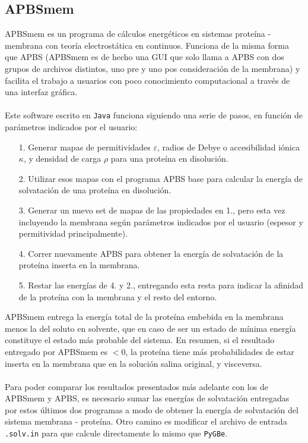 \documentclass[12pt, twoside, onehalfspace, numbers, spanish]{ezthesis}
\numberwithin{equation}{section}
\begin{document}
\subsection{APBSmem}\label{subsec:APBSmem}
APBSmem es un programa de cálculos energéticos en sistemas proteína - membrana con teoría electrostática en continuos. Funciona de la misma forma que APBS (APBSmem es de hecho una GUI que solo llama a APBS con dos grupos de archivos distintos, uno pre y uno pos consideración de la membrana) y facilita el trabajo a usuarios con poco conocimiento computacional a través de una interfaz gráfica.\\\\
Este software escrito en \texttt{Java} funciona siguiendo una serie de pasos, en función de parámetros indicados por el usuario:
\begin{itemize}
	\item[1.] Generar mapas de permitividades $\varepsilon$, radios de Debye o accesibilidad iónica $\kappa$, y densidad de carga $\rho$ para una proteína en disolución.
	\item[2.] Utilizar esos mapas con el programa APBS base para calcular la energía de solvatación de una proteína en disolución.
	\item[3.] Generar un nuevo set de mapas de las propiedades en 1., pero esta vez incluyendo la membrana según parámetros indicados por el usuario (espesor y permitividad principalmente).
	\item[4.] Correr nuevamente APBS para obtener la energía de solvatación de la proteína inserta en la membrana.
	\item[5.] Restar las energías de 4. y 2., entregando esta resta para indicar la afinidad de la proteína con la membrana y el resto del entorno.
\end{itemize}
APBSmem entrega la energía total de la proteína embebida en la membrana menos la del soluto en solvente, que en caso de ser un estado de mínima energía constituye el estado más probable del sistema. En resumen, si el resultado entregado por APBSmem es $<0$, la proteína tiene más probabilidades de estar inserta en la membrana que en la solución salina original, y visceversa.\\\\
Para poder comparar los resultados presentados más adelante con los de APBSmem y APBS, es necesario sumar las energías de solvatación entregadas por estos últimos dos programas a modo de obtener la energía de solvatación del sistema membrana - proteína. Otro camino es modificar el archivo de entrada \texttt{.solv.in} para que calcule directamente lo mismo que \texttt{PyGBe}.
\end{document}
